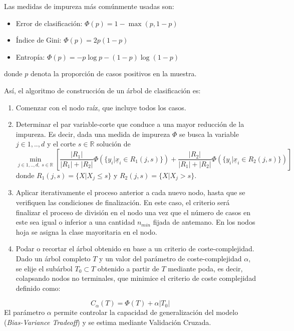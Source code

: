 \documentclass[12pt,a4paper,]{book}
\numberwithin{dummy}{section}
\theoremstyle{ocrenumbox}
\theoremstyle{blacknumex}
\theoremstyle{blacknumbox}
\theoremstyle{ocrenum}
\theoremstyle{ocrenum}
\begin{document}
Las medidas de impureza más comúnmente usadas son:

\begin{itemize}
\item
  Error de clasificación: \(\Phi(p) = 1 - \max(p,1-p)\)
\item
  Índice de Gini: \(\Phi(p) = 2p(1-p)\)
\item
  Entropía: \(\Phi(p) = -p \log p - (1 - p) \log (1 - p)\)
\end{itemize}

donde \(p\) denota la proporción de casos positivos en la muestra.

Así, el algoritmo de construcción de un árbol de clasificación es:

\begin{enumerate}
\def\labelenumi{\arabic{enumi}.}
\item
  Comenzar con el nodo raíz, que incluye todos los casos.
\item
  Determinar el par variable-corte que conduce a una mayor reducción de
  la impureza. Es decir, dada una medida de impureza \(\Phi\) se busca
  la variable \(j \in {1,..,d}\) y el corte \(s \in \mathbb{R}\)
  solución de \[\min_{j \in {1,..,d},\;s \in \mathbb{R}}\left[ 
  \frac{|R_1|}{|R_1|+|R_2|} \Phi \left(\{y_i |\underline x_i \in R_1(j,s)\} \right)  + 
  \frac{|R_2|}{|R_1|+|R_2|} \Phi \left(\{y_i |\underline x_i \in R_2(j,s)\} \right)\right]\]
  donde \(R_1(j,s) = \{X | X_j \le s \}\) y
  \(R_2(j,s) = \{X | X_j > s \}\).
\item
  Aplicar iterativamente el proceso anterior a cada nuevo nodo, hasta
  que se verifiquen las condiciones de finalización. En este caso, el
  criterio será finalizar el proceso de división en el nodo una vez que
  el número de casos en este sea igual o inferior a una cantidad
  \(n_{min}\) fijada de antemano. En los nodos hoja se asigna la clase
  mayoritaria en el nodo.
\item
  Podar o recortar el árbol obtenido en base a un criterio de
  coste-complejidad. Dado un árbol completo \(T\) y un valor del
  parámetro de coste-complejidad \(\alpha\), se elije el subárbol
  \(T_0 \subset T\) obtenido a partir de \(T\) mediante poda, es decir,
  colapsando nodos no terminales, que minimice el criterio de coste
  complejidad definido como:
\end{enumerate}

\[C_{\alpha}(T) = \Phi(T) + \alpha|T_0|\] El parámetro \(\alpha\)
permite controlar la capacidad de generalización del modelo
(\emph{Bias-Variance Tradeoff}) y se estima mediante Validación Cruzada.
\end{document}
